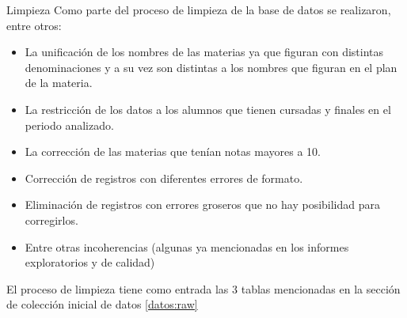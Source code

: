 
Limpieza
Como parte del proceso de limpieza de la base de datos se realizaron, entre otros:
\begin{itemize}
\item La unificación de los nombres de las materias ya que figuran con distintas denominaciones y a su vez son distintas a los nombres que figuran en el plan de la materia.
\item La restricción de los datos a los alumnos que tienen cursadas y finales en el periodo analizado. 
\item La corrección de las materias que tenían notas mayores a 10. 
\item Corrección de registros con diferentes errores de formato.
\item Eliminación de registros con errores groseros que no hay posibilidad para corregirlos.
\item Entre otras incoherencias (algunas ya mencionadas en los informes exploratorios y de calidad) 
\end{itemize}

El proceso de limpieza tiene como entrada las 3 tablas mencionadas en la sección de colección inicial de datos \ref{datos:raw}



